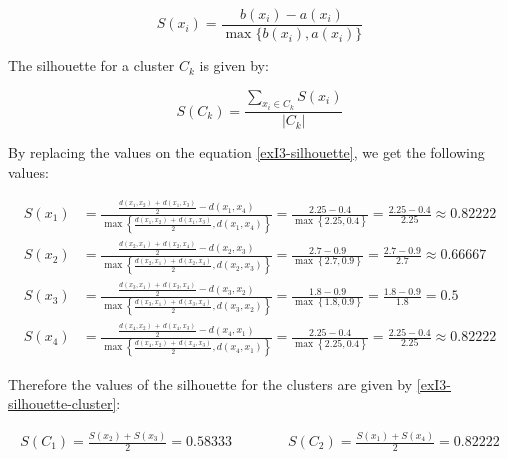 \documentclass[12pt]{article}
\begin{document}
\begin{enumerate}[leftmargin=\labelsep]
        \begin{equation}\label{exI3-silhouette}
          S(x_i) = \frac{b(x_i) - a(x_i)}{\max\{b(x_i), a(x_i)\}}
        \end{equation}

        The silhouette for a cluster $C_k$ is given by:

        \begin{equation}\label{exI3-silhouette-cluster}
          S(C_k) = \frac{\sum_{x_i \in C_k} S(x_i)}{\left|C_k\right|}
        \end{equation}

        By replacing the values on the equation \eqref{exI3-silhouette}, we get the following values:

        \begingroup
        \allowdisplaybreaks
        \addtolength{\jot}{0.7em}
        \begin{align*}
          S(x_1) & = \frac{\frac{d(x_1, x_2) \,+\, d(x_1, x_3)}{2} - d(x_1,x_4)}{\max\left\{\frac{d(x_1, x_2) \,+\, d(x_1, x_3)}{2}, d(x_1,x_4)\right\}}
          = \frac{2.25 - 0.4}{\max\left\{2.25, 0.4\right\}} = \frac{2.25 - 0.4}{2.25} \approx 0.82222                                                    \\
          S(x_2) & = \frac{\frac{d(x_2, x_1) \,+\, d(x_2, x_4)}{2} - d(x_2,x_3)}{\max\left\{\frac{d(x_2, x_1) \,+\, d(x_2, x_4)}{2}, d(x_2,x_3)\right\}}
          = \frac{2.7 - 0.9}{\max\left\{2.7, 0.9\right\}} = \frac{2.7 - 0.9}{2.7} \approx 0.66667                                                        \\
          S(x_3) & = \frac{\frac{d(x_3, x_1) \,+\, d(x_3, x_4)}{2} - d(x_3,x_2)}{\max\left\{\frac{d(x_3, x_1) \,+\, d(x_3, x_4)}{2}, d(x_3,x_2)\right\}}
          = \frac{1.8 - 0.9}{\max\left\{1.8, 0.9\right\}} = \frac{1.8 - 0.9}{1.8} = 0.5                                                                  \\
          S(x_4) & = \frac{\frac{d(x_4, x_2) \,+\, d(x_4, x_3)}{2} - d(x_4,x_1)}{\max\left\{\frac{d(x_4, x_2) \,+\, d(x_4, x_3)}{2}, d(x_4,x_1)\right\}}
          = \frac{2.25 - 0.4}{\max\left\{2.25, 0.4\right\}} = \frac{2.25 - 0.4}{2.25} \approx 0.82222
        \end{align*}
        \endgroup

        Therefore the values of the silhouette for the clusters are given by \eqref{exI3-silhouette-cluster}:

        \vskip -0.3cm
        \begin{align*}
          S(C_1) = \frac{S(x_2) + S(x_3)}{2} = 0.58333 \qquad\qquad
          S(C_2) = \frac{S(x_1) + S(x_4)}{2} = 0.82222
        \end{align*}



\end{enumerate}
\end{document}
